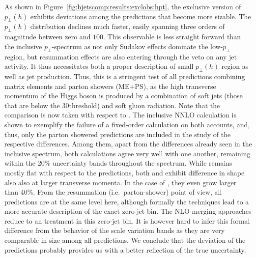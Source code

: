 As shown in Figure~\ref{fig:hjetscomp:results:exclobs:hpt}, the
exclusive version of $p_\perp(h)$ exhibits deviations among the
predictions that become more sizable. The $p_\perp(h)$ distribution 
declines much faster, easily spanning three orders of magnitude 
between zero and $100$\gev. This observable is less straight forward 
than the inclusive $p_\perp$-spectrum as not only Sudakov effects 
dominate the low-$p_\perp$ region, but resummation effects are also 
entering through the veto on any jet activity. It thus necessitates 
both a proper description of small $p_\perp(h)$ region as well as 
jet production. Thus,
this is a stringent test of all predictions combining matrix elements and parton showers (ME+PS), as
the high transverse momentum of the Higgs boson is produced by a
combination of soft jets (those that are below the $30$\gev threshold)
and soft gluon radiation. Note that the comparison is now taken with respect to
\Powheg \NNLOPS. The inclusive 
NNLO calculation is shown to exemplify the failure of a fixed-order 
calculation on both accounts, and, thus, only the parton showered 
predictions are included in the study of the respective differences. 
Among them, apart from the differences already seen in the inclusive 
spectrum, both \NNLOPS calculations agree very well with one another, 
remaining within the 20\% uncertainty bands throughout the spectrum. 
While \Sherpa \MEPSatNLO remains mostly flat with respect to the \NNLOPS 
predictions, both \MGaMC and \Herwig exhibit difference in shape also 
also at larger transverse momenta. In the case
of \Herwig, they even grow larger than 40\%. 
From the resummation (i.e.~parton-shower)
point of view, all predictions are at the same level here, although
formally the \NNLOPS techniques lead to a more accurate description of
the exact zero-jet bin. The NLO merging approaches reduce to an \NLOPS
treatment in this zero-jet bin. It is however hard to infer this
formal difference from the behavior of the scale variation bands as
they are very comparable in size among all predictions. We conclude
that the deviation of the predictions probably provides us with a
better reflection of the true uncertainty.


